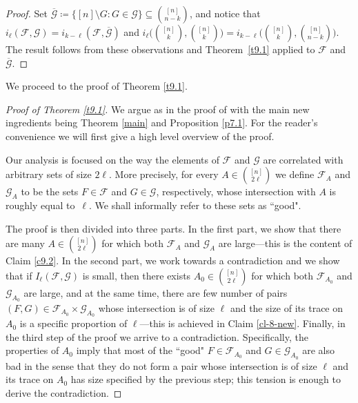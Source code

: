 \documentclass[10pt,a4paper]{amsart}
\theoremstyle{remark}
\newcommand{\Fcal}{\mathcal{F}}
\newcommand{\Gcal}{\mathcal{G}}
\begin{document}
\begin{proof}
Set $\overline{\Gcal}\coloneqq \big\{[n]\setminus G: G\in \Gcal\big\}\subseteq \binom{[n]}{n-k}$,
and notice that $i_{\ell}(\Fcal,\Gcal)=i_{k-\ell}(\Fcal,\overline{\Gcal})$ and
$i_{\ell}\big(\binom{[n]}{k},\binom{[n]}{k}\big)=i_{k-\ell}\big(\binom{[n]}{k},\binom{[n]}{n-k}\big)$.
The result follows from these observations and Theorem~\ref{t9.1} applied to $\Fcal$ and $\overline{\Gcal}$.
\end{proof}
We proceed to the proof of Theorem \ref{t9.1}.
\begin{proof}[Proof of Theorem \emph{\ref{t9.1}}]
We argue as in the proof of \cite[Theorem 1.14]{FR87} with the main new ingredients being
Theorem \ref{main} and Proposition \ref{p7.1}. For the reader's convenience we will first give a high level overview of the proof.

Our analysis is focused on the way the elements of $\Fcal$ and $\Gcal$ are correlated with arbitrary sets of size $2\ell$.
More precisely, for every $A\in\binom{[n]}{2\ell}$ we define $\Fcal_A$ and $\Gcal_A$ to be the sets $F\in \Fcal$
and $G\in \Gcal$, respectively, whose intersection with $A$ is roughly equal to~$\ell$.
We shall informally refer to these sets as ``good"\!.

The proof is then divided into three parts. In the first part, we show that there are many $A\in\binom{[n]}{2\ell}$ for which
both $\Fcal_A$ and $\Gcal_A$ are large---this is the content of Claim \ref{c9.2}. In the second part, we work towards
a contradiction  and we show that if $I_{\ell}(\Fcal,\Gcal)$ is small, then there exists $A_0\in\binom{[n]}{2\ell}$ for which
both $\Fcal_{A_0}$ and $\Gcal_{A_0}$ are large, and at the same time, there are few number of pairs $(F,G)\in\Fcal_{A_0}\times\Gcal_{A_0}$ whose intersection is of size $\ell$ and the size of its trace on $A_0$
is a specific proportion of $\ell$---this is achieved in Claim \ref{cl-8-new}.
Finally, in the third step of the proof we arrive to a contradiction. Specifically, the properties of $A_0$ imply that most of the ``good" $F\in \Fcal_{A_0}$ and $G\in \Gcal_{A_0}$ are also bad in the sense that they do not form a pair whose  intersection is of size $\ell$ and its trace on $A_0$ has size specified by the previous step; this tension is enough to derive
the contradiction.


\end{proof}
\end{document}
